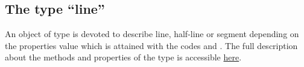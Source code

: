 \documentclass[pdftex]{article}
\begin{document}
\subsection{The type \texorpdfstring{``line''}{line}}
An object of type  is devoted  to describe  line,  half-line
or  segment depending on the properties value  which is attained with the codes    and
.
The full description about the methods and properties of the type 
is accessible
\href{http://piprim.tuxfamily.org/asymptote/geometry/modules/geometry.asy.index.sign.html#struct\%20line}{here}.
\end{document}
